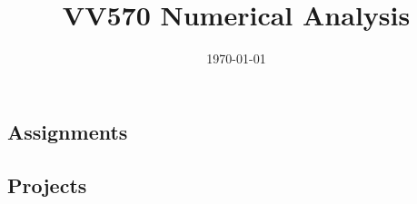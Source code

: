 \documentclass[12pt,letterpaper]{book}
\title{{\textbf{VV570 Numerical Analysis}}}
\author{\href{http://www-personal.umich.edu/~yugtmath}{\calligra{Guangting Yu}}}
\date{\today}
\theoremstyle{definition}
\begin{document}
\begin{preview}
\part{Assignments}
\renewcommand{\chaptername}{Assignment}
\end{preview}
\begin{preview}

\end{preview}
\begin{preview}

\end{preview}
\begin{preview}

\end{preview}
\begin{preview}

\end{preview}
\begin{preview}

\end{preview}
\begin{preview}

\end{preview}
\begin{preview}

\end{preview}
\begin{preview}

\end{preview}
\begin{preview}
\part{Projects}
\renewcommand{\chaptername}{Projects}
\end{preview}
\begin{preview}

\end{preview}
\begin{preview}
\printbibliography
\end{preview}
\end{document}
